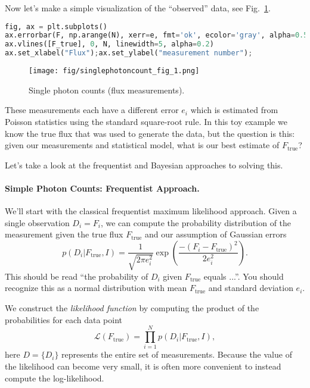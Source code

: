 \documentclass[%
oneside,                 %
final,                   %
10pt]{article}
\begin{document}
Now let's make a simple visualization of the ``observed'' data, see Fig.~\ref{fig:flux}.

\begin{lstlisting}[language=Python,style=blue1]
fig, ax = plt.subplots()
ax.errorbar(F, np.arange(N), xerr=e, fmt='ok', ecolor='gray', alpha=0.5)
ax.vlines([F_true], 0, N, linewidth=5, alpha=0.2)
ax.set_xlabel("Flux");ax.set_ylabel("measurement number");
\end{lstlisting}


\begin{figure}[!ht]  %
  \centerline{\texttt{[image: fig/singlephotoncount\_fig\_1.png]}}
  \caption{
  Single photon counts (flux measurements). \label{fig:flux}
  }
\end{figure}


These measurements each have a different error $e_i$ which is estimated from Poisson statistics using the standard square-root rule. In this toy example we know the true flux that was used to generate the data, but the question is this: given our measurements and statistical model, what is our best estimate of $F_\mathrm{true}$?

Let's take a look at the frequentist and Bayesian approaches to solving this.

\paragraph{Simple Photon Counts: Frequentist Approach.}
We'll start with the classical frequentist maximum likelihood approach. Given a single observation $D_i = F_i$, we can compute the probability distribution of the measurement given the true flux $F_\mathrm{true}$ and our assumption of Gaussian errors
\begin{equation}
p(D_i | F_\mathrm{true}, I) = \frac{1}{\sqrt{2\pi e_i^2}} \exp \left( \frac{-(F_i-F_\mathrm{true})^2}{2e_i^2} \right).
\end{equation}
This should be read ``the probability of $D_i$ given $F_\mathrm{true}$
equals ...''. You should recognize this as a normal distribution with mean $F_\mathrm{true}$ and standard deviation $e_i$.

We construct the \emph{likelihood function} by computing the product of the probabilities for each data point
\begin{equation}
\mathcal{L}(F_\mathrm{true}) = \prod_{i=1}^N p(D_i | F_\mathrm{true}, I),
\end{equation}
here $D = \{D_i\}$ represents the entire set of measurements. Because the value of the likelihood can become very small, it is often more convenient to instead compute the log-likelihood. 
\end{document}
